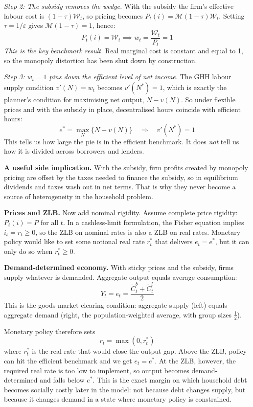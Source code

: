 \documentclass[11pt,a4paper]{article}
\begin{document}
\textit{Step 2: The subsidy removes the wedge.} With the subsidy the firm's effective labour cost is $(1-\tau)\mathcal{W}_t$, so pricing becomes $P_t(i) = \mathcal{M}(1-\tau)\mathcal{W}_t$. Setting $\tau = 1/\varepsilon$ gives $\mathcal{M}(1-\tau) = 1$, hence:
\begin{equation}
P_t(i) = \mathcal{W}_t \implies w_t = \frac{\mathcal{W}_t}{P_t} = 1
\end{equation}
\textit{This is the key benchmark result.} Real marginal cost is constant and equal to 1, so the monopoly distortion has been shut down by construction.

\textit{Step 3: $w_t = 1$ pins down the efficient level of net income.} The GHH labour supply condition $v'(N) = w_t$ becomes $v'(N^*) = 1$, which is exactly the planner's condition for maximising net output, $N-v(N)$. So under flexible prices and with the subsidy in place, decentralised hours coincide with efficient hours:
\begin{equation}
e^* = \max_{N}\{N - v(N)\} \quad \Rightarrow \quad v'(N^*) = 1
\end{equation}
This tells us how large the pie is in the efficient benchmark. It does \textit{not} tell us how it is divided across borrowers and lenders.

\textbf{A useful side implication.} With the subsidy, firm profits created by monopoly pricing are offset by the taxes needed to finance the subsidy, so in equilibrium dividends and taxes wash out in net terms. That is why they never become a source of heterogeneity in the household problem.

\textbf{Prices and ZLB.} Now add nominal rigidity. Assume complete price rigidity: $P_t(i) = P$ for all $t$. In a cashless-limit formulation, the Fisher equation implies $i_t = r_t \geq 0$, so the ZLB on nominal rates is also a ZLB on real rates. Monetary policy would like to set some notional real rate $r_t^*$ that delivers $e_t=e^*$, but it can only do so when $r_t^* \geq 0$.

\textbf{Demand-determined economy.} With sticky prices and the subsidy, firms supply whatever is demanded. Aggregate output equals average consumption:
\begin{equation}
Y_t = e_t = \frac{\tilde{C}_t^b + \tilde{C}_t^l}{2}
\end{equation}
This is the goods market clearing condition: aggregate supply (left) equals aggregate demand (right, the population-weighted average, with group sizes $\frac{1}{2}$).

Monetary policy therefore sets
\begin{equation}
r_t = \max(0, r_t^*)
\end{equation}
where $r_t^*$ is the real rate that would close the output gap. Above the ZLB, policy can hit the efficient benchmark and we get $e_t=e^*$. At the ZLB, however, the required real rate is too low to implement, so output becomes demand-determined and falls below $e^*$. This is the exact margin on which household debt becomes socially costly later in the model: not because debt changes supply, but because it changes demand in a state where monetary policy is constrained.
\end{document}
